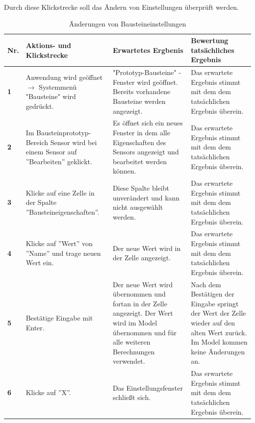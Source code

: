 \documentclass[parskip=full]{scrartcl}
\begin{document}
Durch diese Klickstrecke soll das Ändern von Einstellungen überprüft werden.

\begin{table}[h]
    \begin{tabular}{| p{} | p{} | p{} | p{} |}
        \hline
        \textbf{Nr.} & \textbf{Aktions- und Klickstrecke} & \textbf{Erwartetes Ergbenis}  & \textbf{ Bewertung tatsächliches Ergebnis} \\ \hline
        \textbf{1}
        & 
        Anwendung wird geöffnet $\rightarrow$ Systemmenü "Bausteine" wird gedrückt.
        &
        "Prototyp-Bausteine" - Fenster wird geöffnet. Bereits vorhandene Bausteine werden angezeigt.
        & 
        Das erwartete Ergebnis stimmt mit dem dem tatsächlichen Ergebnis überein.
        \\ \hline
        
        \textbf{2}
        & 
        Im Bausteinprototyp-Bereich Sensor wird bei einem Sensor auf ''Bearbeiten'' geklickt.
        &
        Es öffnet sich ein neues Fenster in dem alle Eigenschaften des Sensors angezeigt und bearbeitet werden können.
        & 
        Das erwartete Ergebnis stimmt mit dem dem tatsächlichen Ergebnis überein.
        \\ \hline
        
        \textbf{3}
        & 
        Klicke auf eine Zelle in der Spalte ''Bausteineigenschaften''.
        &
        Diese Spalte bleibt unverändert und kann nicht ausgewählt werden.
        & 
        Das erwartete Ergebnis stimmt mit dem dem tatsächlichen Ergebnis überein.
        \\ \hline
        
        
        
        \textbf{4}
        & 
        Klicke auf ''Wert'' von ''Name'' und trage neuen Wert ein.
        &
        Der neue Wert wird in der Zelle angezeigt.
        & 
        Das erwartete Ergebnis stimmt mit dem dem tatsächlichen Ergebnis überein.
        \\ \hline
        
        \textbf{5}
        & 
        Bestätige Eingabe mit Enter.
        &
        Der neue Wert wird übernommen und fortan in der Zelle angezeigt. Der Wert wird im Model übernommen und für alle weiteren Berechnungen verwendet.
        & 
        Nach dem Bestätigen der Eingabe springt der Wert der Zelle wieder auf den alten Wert zurück. Im Model kommen keine Änderungen an.
        \\ \hline
        
        \textbf{6}
        & 
        Klicke auf ''X''.
        &
        Das Einstellungsfenster schließt sich.
        & 
        Das erwartete Ergebnis stimmt mit dem dem tatsächlichen Ergebnis überein.
        \\ \hline
    \end{tabular}
\caption{Änderungen von Bausteineinstellungen}
\label{BausteinEinstellungKlickStrecke}
\end{table} 
\end{document}
